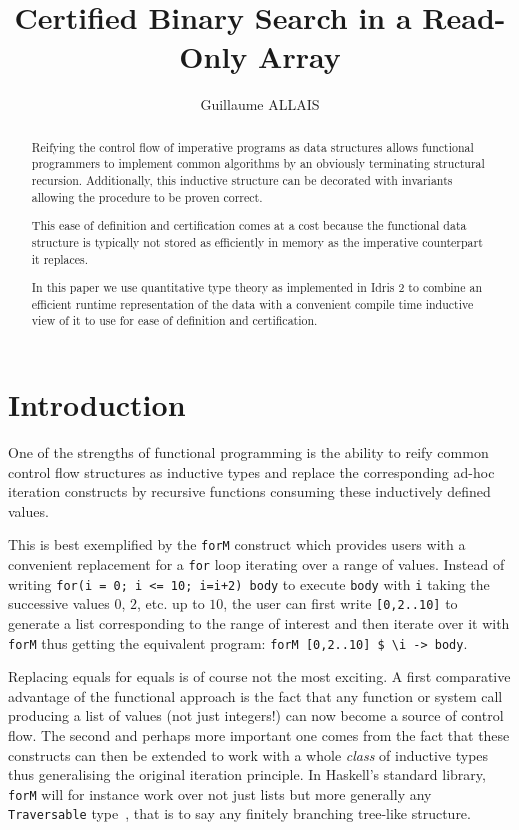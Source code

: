 \documentclass{article}
\title{Certified Binary Search in a Read-Only Array}
\author{Guillaume ALLAIS}
\begin{document}
\maketitle

\begin{abstract}
  Reifying the control flow of imperative programs as data structures allows
  functional programmers to implement common algorithms by an obviously
  terminating structural recursion. Additionally, this inductive structure
  can be decorated with invariants allowing the procedure to be proven correct.

  This ease of definition and certification comes at a cost because the
  functional data structure is typically not stored as efficiently in
  memory as the imperative counterpart it replaces.

  In this paper we use quantitative type theory as implemented in Idris 2 to
  combine an efficient runtime representation of the data with a convenient
  compile time inductive view of it to use for ease of definition and
  certification.
\end{abstract}

\section{Introduction}

One of the strengths of functional programming is the ability to reify common
control flow structures as inductive types and replace the corresponding ad-hoc
iteration constructs by recursive functions consuming these inductively defined
values.

This is best exemplified by the \texttt{forM} construct which provides users with
a convenient replacement for a \texttt{for} loop iterating over a range of values.
Instead of writing \texttt{for(i = 0; i <= 10; i=i+2) body} to execute \texttt{body}
with \texttt{i} taking the successive values $0$, $2$, etc. up to $10$, the user
can first write \texttt{[0,2..10]} to generate a list corresponding to the range
of interest and then iterate over it with \texttt{forM} thus getting the equivalent
program: \texttt{forM [0,2..10] \$ \textbackslash i -> body}.

Replacing equals for equals is of course not the most exciting. A first comparative
advantage of the functional approach is the fact that any function or system call
producing a list of values (not just integers!) can now become a source of control
flow.
%
The second and perhaps more important one comes from the fact that these constructs
can then be extended to work with a whole \emph{class} of inductive types thus
generalising the original iteration principle. In Haskell's standard library,
\texttt{forM} will for instance work over not just lists but more generally
any \texttt{Traversable} type~\citep{DBLP:journals/jfp/McbrideP08},
that is to say any finitely branching tree-like structure.
\end{document}

